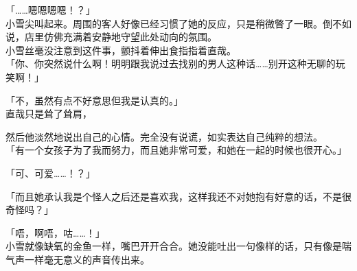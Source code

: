 「……嗯嗯嗯嗯！？」\\

小雪尖叫起来。周围的客人好像已经习惯了她的反应，只是稍微瞥了一眼。倒不如说，店里仿佛充满着安静地守望此处动向的氛围。\\

小雪丝毫没注意到这件事，颤抖着伸出食指指着直哉。\\

「你、你突然说什么啊！明明跟我说过去找别的男人这种话……别开这种无聊的玩笑啊！」

「不，虽然有点不好意思但我是认真的。」\\

直哉只是耸了耸肩，

然后他淡然地说出自己的心情。完全没有说谎，如实表达自己纯粹的想法。\\

「有一个女孩子为了我而努力，而且她非常可爱，和她在一起的时候也很开心。」

「可、可爱……！？」

「而且她承认我是个怪人之后还是喜欢我，这样我还不对她抱有好意的话，不是很奇怪吗？」

「唔，啊唔，咕……！」\\

小雪就像缺氧的金鱼一样，嘴巴开开合合。她没能吐出一句像样的话，只有像是喘气声一样毫无意义的声音传出来。\\


